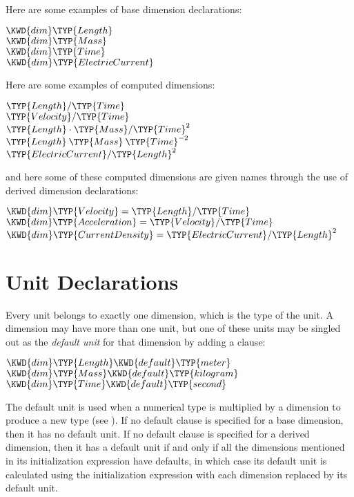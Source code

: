 Here are some examples of base dimension declarations:
\begin{Fortress}
\(\KWD{dim} \TYP{Length}\)\\
\(\KWD{dim} \TYP{Mass}\)\\
\(\KWD{dim} \TYP{Time}\)\\
\(\KWD{dim} \TYP{ElectricCurrent}\)
\end{Fortress}
Here are some examples of computed dimensions:
\begin{Fortress}
\(\TYP{Length} / \TYP{Time}\)\\
\(\TYP{Velocity} / \TYP{Time}\)\\
\(\TYP{Length} \cdot \TYP{Mass} / \TYP{Time}^{2}\)\\
\(\TYP{Length}\mskip 4mu plus 4mu\TYP{Mass}\mskip 4mu plus 4mu\TYP{Time}^{-2}\)\\
\(\TYP{ElectricCurrent} / \TYP{Length}^{2}\)
\end{Fortress}
and here some of these computed dimensions are given names through the use of
derived dimension declarations:
\begin{Fortress}
\(\KWD{dim} \TYP{Velocity} = \TYP{Length} / \TYP{Time}\)\\
\(\KWD{dim} \TYP{Acceleration} = \TYP{Velocity} / \TYP{Time}\)\\
\(\KWD{dim} \TYP{CurrentDensity} = \TYP{ElectricCurrent} / \TYP{Length}^{2}\)
\end{Fortress}

\section{Unit Declarations}
Every unit belongs to exactly one dimension, which is the type of the unit.
A dimension may have more than one unit,
but one of these units may be singled out as the \emph{default unit} for that dimension
by adding a  clause:
\begin{Fortress}
\(\KWD{dim} \TYP{Length} \KWD{default} \TYP{meter}\)\\
\(\KWD{dim} \TYP{Mass} \KWD{default} \TYP{kilogram}\)\\
\(\KWD{dim} \TYP{Time} \KWD{default} \TYP{second}\)
\end{Fortress}
The default unit is used when a numerical type is multiplied by a
dimension to produce a new type (see ).
If no default clause is specified for a base dimension, then it has
no default unit.  If no default clause is specified for a derived
dimension, then it has a default unit if and only if all the
dimensions mentioned in its initialization expression have defaults,
in which case its default unit is calculated using the initialization
expression with each dimension replaced by its default unit.

